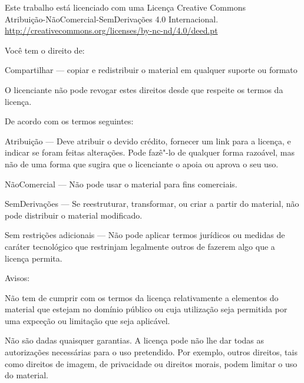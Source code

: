 \cleartorecto
\thispagestyle{bottomcenter}

{\copyrightsize\setlength{\parindent}{0pt}%
\raggedright\label{copyright-details}
\setlength{\parskip}{7pt}

{\centering

{\normalsize\ccbyncnd}

Este trabalho está licenciado com uma Licença Creative Commons\\
Atribuição-NãoComercial-SemDerivações 4.0 Internacional.\\
\url{http://creativecommons.org/licenses/by-nc-nd/4.0/deed.pt}

}

Você tem o direito de:

\begin{packeditemize}
\item Compartilhar — copiar e redistribuir o material em qualquer suporte ou formato
\end{packeditemize}

O licenciante não pode revogar estes direitos desde que respeite os termos da licença.

De acordo com os termos seguintes:

\begin{packeditemize}
\item Atribuição — Deve atribuir o devido crédito, fornecer um link para a licença, e indicar se foram feitas alterações. Pode fazê"-lo de qualquer forma razoável, mas não de uma forma que sugira que o licenciante o apoia ou aprova o seu uso.
\item NãoComercial — Não pode usar o material para fins comerciais.
\item SemDerivações — Se reestruturar, transformar, ou criar a partir do material, não pode distribuir o material modificado.
\end{packeditemize}

Sem restrições adicionais — Não pode aplicar termos jurídicos ou medidas de caráter tecnológico que restrinjam legalmente outros de fazerem algo que a licença permita.

\clearpage
\thispagestyle{bottomcenter}

Avisos:

Não tem de cumprir com os termos da licença relativamente a elementos do material que estejam no domínio público ou cuja utilização seja permitida por uma expceção ou limitação que seja aplicável.

Não são dadas quaisquer garantias. A licença pode não lhe dar todas as autorizações necessárias para o uso pretendido. Por exemplo, outros direitos, tais como direitos de imagem, de privacidade ou direitos morais, podem limitar o uso do material.

}
